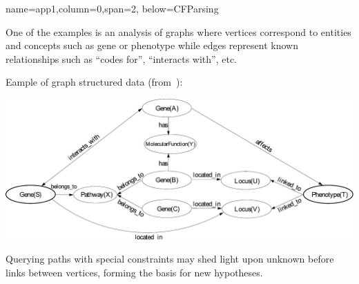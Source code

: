 \documentclass[a0paper,portrait]{baposter}
\begin{document}
\begin{poster}

{name=app1,column=0,span=2, below=CFParsing}
{ %
One of the examples is an analysis of graphs where vertices correspond to entities and concepts such as gene or phenotype while edges represent known relationships such as ``codes for'', ``interacts with'', etc.

Eample of graph structured data (from~\cite{Earley}):

\begin{center}
\includegraphics[width=\textwidth]{gsd.pdf}
\end{center}
Querying paths with special constraints may shed light upon unknown before links between vertices, forming the basis for new hypotheses.
}



\end{poster}
\end{document}
